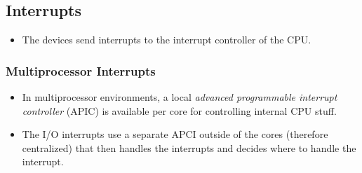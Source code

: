 \documentclass[a4paper, 11pt, accentcolor = tud3b]{tudreport}
\begin{document}
            \subsection{Interrupts}
                \begin{itemize}
                	\item The devices send interrupts to the interrupt controller of the CPU.
                \end{itemize}
            
	            \subsubsection{Multiprocessor Interrupts}
		            \begin{itemize}
		            	\item In multiprocessor environments, a local \textit{advanced programmable interrupt controller} (APIC) is available per core for controlling internal CPU stuff.
		            	\item The I/O interrupts use a separate APCI outside of the cores (therefore centralized) that then handles the interrupts and decides where to handle the interrupt.
		            \end{itemize}
\end{document}
